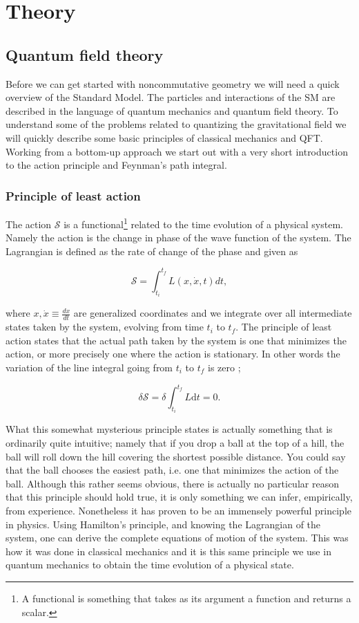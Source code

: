 \section{Theory}
\subsection{Quantum field theory}
Before we can get started with noncommutative geometry we will need a quick overview of the Standard Model. The particles and interactions of the SM are described in the language of quantum mechanics and quantum field theory. To understand some of the problems related to quantizing the gravitational field we will quickly describe some basic principles of classical mechanics and QFT. Working from a bottom-up approach we start out with a very short introduction to the action principle and Feynman's path integral.

\subsubsection{Principle of least action}
The action $\mathcal{S}$ is a functional\footnote{A functional is something that takes as its argument a function and returns a scalar.} related to the time evolution of a physical system. Namely the action is the change in phase of the wave function of the system. The Lagrangian is defined as the rate of change of the phase and given as 

\begin{equation}\label{eq:S}
	\mathcal{S} = \int_{t_i}^{t_f} L(x,\dot{x},t)dt,
\end{equation}

where $x, \dot{x} \equiv \frac{dx}{dt}$ are generalized coordinates and we integrate over all intermediate states taken by the system, evolving from time $t_i$ to $t_f$. The principle of least action states that the actual path taken by the system is one that minimizes the action, or more precisely one where the action is stationary. In other words the variation of the line integral going from $t_i$ to $t_f$ is zero \cite{goldstein1959};

\begin{equation}
	\delta \mathcal{S} = \delta \int_{t_i}^{t_f} L \textrm{d}t = 0.
\end{equation}

What this somewhat mysterious principle states is actually something that is ordinarily quite intuitive; namely that if you drop a ball at the top of a hill, the ball will roll down the hill covering the shortest possible distance. You could say that the ball chooses the easiest path, i.e. one that minimizes the action of the ball. Although this rather seems obvious, there is actually no particular reason that this principle should hold true, it is only something we can infer, empirically, from experience. Nonetheless it has proven to be an immensely powerful principle in physics. Using Hamilton's principle, and knowing the Lagrangian of the system, one can derive the complete equations of motion of the system. This was how it was done in classical mechanics and it is this same principle we use in quantum mechanics to obtain the time evolution of a physical state.

